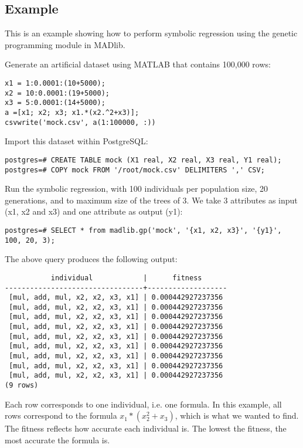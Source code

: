 \subsection*{Example}
This is an example showing how to perform symbolic regression using the genetic programming module in MADlib. 

\vspace{\baselineskip}
{\raggedleft Generate an artificial dataset using MATLAB that contains 100,000 rows:}

\lstset{language=Matlab}
\lstset{tabsize=4}
\begin{lstlisting}
x1 = 1:0.0001:(10+5000);
x2 = 10:0.0001:(19+5000);
x3 = 5:0.0001:(14+5000);
a =[x1; x2; x3; x1.*(x2.^2+x3)];
csvwrite('mock.csv', a(1:100000, :))
\end{lstlisting}

{\raggedleft Import this dataset within PostgreSQL:}
\begin{verbatim}
postgres=# CREATE TABLE mock (X1 real, X2 real, X3 real, Y1 real);
postgres=# COPY mock FROM '/root/mock.csv' DELIMITERS ',' CSV;
\end{verbatim}

{\raggedleft Run the symbolic regression, with 100 individuals per population size, 20 generations, and to maximum size of the trees of 3. We take 3 attributes as input (x1, x2 and x3) and one attribute as output (y1):}

\begin{verbatim}
postgres=# SELECT * from madlib.gp('mock', '{x1, x2, x3}', '{y1}', 100, 20, 3);
\end{verbatim}

{\raggedleft The above query produces the following output:}
\begin{verbatim}
           individual            |      fitness
---------------------------------+-------------------
 [mul, add, mul, x2, x2, x3, x1] | 0.000442927237356
 [mul, add, mul, x2, x2, x3, x1] | 0.000442927237356
 [mul, add, mul, x2, x2, x3, x1] | 0.000442927237356
 [mul, add, mul, x2, x2, x3, x1] | 0.000442927237356
 [mul, add, mul, x2, x2, x3, x1] | 0.000442927237356
 [mul, add, mul, x2, x2, x3, x1] | 0.000442927237356
 [mul, add, mul, x2, x2, x3, x1] | 0.000442927237356
 [mul, add, mul, x2, x2, x3, x1] | 0.000442927237356
 [mul, add, mul, x2, x2, x3, x1] | 0.000442927237356
(9 rows)
\end{verbatim}

{\raggedleft Each row corresponds to one individual, i.e. one formula. In this example, all rows correspond to the formula $x_1*(x_2^2+x_3)$, which is what we wanted to find. The fitness reflects how accurate each individual is. The lowest the fitness, the most accurate the formula is.}


